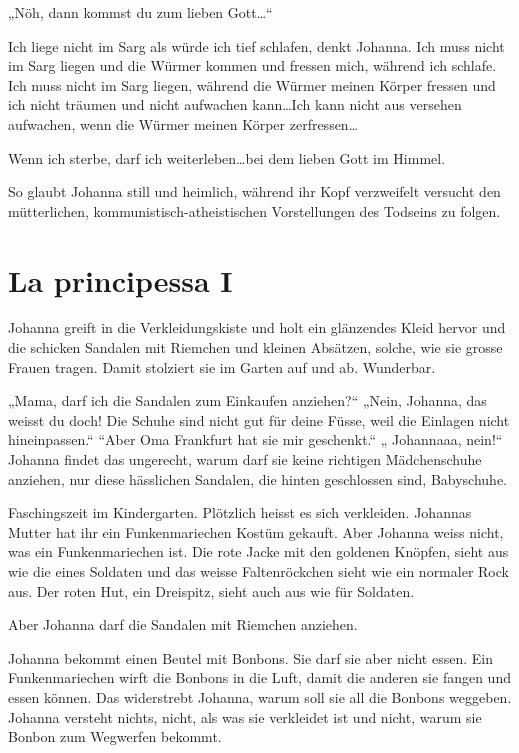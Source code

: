 \documentclass[10pt,titlepage,a5paper]{book}
\begin{document}
„Nöh, dann kommst du zum lieben Gott\dots“

Ich liege nicht im Sarg als würde ich tief schlafen, denkt Johanna. Ich muss nicht im Sarg liegen und die Würmer kommen und fressen mich, während ich schlafe. Ich muss nicht im Sarg liegen, während die Würmer meinen Körper fressen und ich nicht träumen und nicht aufwachen kann\dots Ich kann nicht aus versehen aufwachen, wenn die Würmer meinen Körper zerfressen\dots

Wenn ich sterbe, darf ich weiterleben\dots bei dem lieben Gott im Himmel.

So glaubt Johanna still und heimlich, während ihr Kopf verzweifelt versucht den mütterlichen, kommunistisch-atheistischen Vorstellungen des Todseins zu folgen.


\section*{La principessa I}



Johanna greift in die Verkleidungskiste und holt ein glänzendes Kleid hervor und die schicken Sandalen mit Riemchen und kleinen Absätzen, solche, wie sie grosse Frauen tragen. Damit stolziert sie im Garten auf und ab.
 Wunderbar. 
 
 „Mama, darf  ich die Sandalen zum Einkaufen anziehen?“ „Nein, Johanna, das weisst du doch! Die Schuhe sind nicht gut für deine Füsse, weil die Einlagen nicht hineinpassen.“ “Aber Oma Frankfurt hat sie mir geschenkt.“ „ Johannaaa, nein!“ Johanna findet das ungerecht, warum darf sie keine richtigen Mädchenschuhe anziehen, nur diese hässlichen Sandalen, die hinten geschlossen sind, Babyschuhe.
 
Faschingszeit im Kindergarten. Plötzlich heisst es sich verkleiden. Johannas Mutter hat ihr ein Funkenmariechen Kostüm gekauft. Aber Johanna weiss nicht, was ein Funkenmariechen ist. Die rote Jacke mit den goldenen Knöpfen, sieht aus wie die eines Soldaten und das weisse Faltenröckchen sieht wie ein normaler Rock aus. Der roten Hut, ein Dreispitz, sieht auch aus wie für Soldaten. 

Aber Johanna darf die Sandalen mit Riemchen anziehen. 

Johanna bekommt einen Beutel mit Bonbons. Sie darf sie aber nicht essen. Ein Funkenmariechen wirft die Bonbons in die Luft, damit die anderen sie fangen und essen können. Das widerstrebt Johanna, warum soll sie all die Bonbons weggeben. Johanna versteht nichts, nicht, als was sie verkleidet ist und nicht, warum sie Bonbon zum Wegwerfen bekommt.
\end{document}
